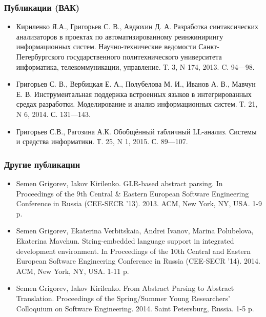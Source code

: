 \documentclass{beamer}
\begin{document}
\begin{frame}
    \transwipe[direction=90]
    \frametitle{Публикации (ВАК)}
  \begin{itemize}
      \item Кириленко Я.А., Григорьев С. В., Авдюхин Д. А. Разработка синтаксических анализаторов в проектах по автоматизированному реинжинирингу информационных систем.  Научно-технические ведомости Санкт-Петербургского государственного политехнического университета информатика, телекоммуникации, управление. Т. 3, N 174, 2013. C. 94---98.
      \item Григорьев С. В., Вербицкая Е. А., Полубелова М. И., Иванов А. В., Мавчун Е. В. Инструментальная поддержка встроенных языков в интегрированных средах разработки. Моделирование и анализ информационных систем. Т. 21, N 6, 2014. С. 131---143.
      \item Григорьев С.В., Рагозина А.К. Обобщённый табличный LL-анализ. Системы и средства информатики. Т. 25, N 1, 2015. С. 89---107.
  \end{itemize} 
\end{frame}

\begin{frame}
    \transwipe[direction=90]
    \frametitle{Другие публикации}
  \begin{itemize}
          \item Semen Grigorev, Iakov Kirilenko. GLR-based abstract parsing. In Proceedings of the 9th Central \& Eastern European Software Engineering Conference in Russia (CEE-SECR ’13). 2013. ACM, New York, NY, USA. 1-9 p.
          \item Semen Grigorev, Ekaterina Verbitskaia, Andrei Ivanov, Marina Polubelova, Ekaterina Mavchun. String-embedded language support in integrated development environment. In Proceedings of the 10th Central and Eastern European Software Engineering Conference in Russia (CEE-SECR '14). 2014. ACM, New York, NY, USA. 1-11 p.
          \item Semen Grigorev, Iakov Kirilenko. From Abstract Parsing to Abstract Translation. Proceedings of the Spring/Summer Young Researchers' Colloquium on Software Engineering. 2014. Saint Petersburg, Russia. 1-5 p.
  \end{itemize} 
\end{frame}
\end{document}
